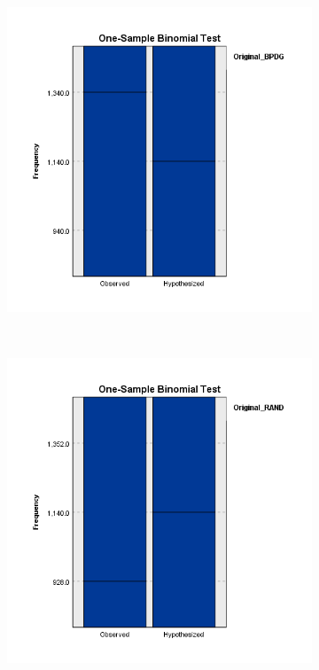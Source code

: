 \documentclass{UoYCSproject}
\begin{document}
  \begin{figure}[htb]
    \centering
    \begin{subfigure}[b]{0.45\textwidth}
      \centering
      \includegraphics[width=\textwidth]{ExternalValidation/original_bpdg.png}
    \end{subfigure}
    ~
    \begin{subfigure}[b]{0.45\textwidth}
      \centering
      \includegraphics[width=\textwidth]{ExternalValidation/original_rand.png}

\end{subfigure}
\end{figure}
\end{document}
